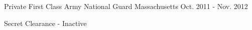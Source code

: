 
\begin{cventries}
  \cventry
    {Private First Class} %
    {Army National Guard} %
    {Massachusetts} %
    {Oct. 2011 - Nov. 2012} %
    {
      \begin{cvitems} %
        \item {Secret Clearance - Inactive}
      \end{cvitems}
    }

\end{cventries}